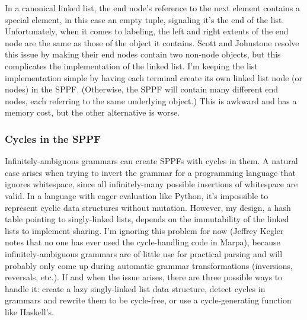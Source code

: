\documentclass[12pt]{article}
\begin{document}
In a canonical linked list, the end node's reference to the next
element contains a special element, in this case an empty tuple,
signaling it's the end of the list.  Unfortunately, when it comes to
labeling, the left and right extents of the end node are the same as
those of the object it contains.  Scott and Johnstone resolve this
issue by making their end nodes contain two non-node objects, but this
complicates the implementation of the linked list.  I'm keeping the
list implementation simple by having each terminal create its own
linked list node (or nodes) in the SPPF.  (Otherwise, the SPPF will
contain many different end nodes, each referring to the same
underlying object.)  This is awkward and has a memory cost, but the
other alternative is worse.

\subsubsection{Cycles in the SPPF}
\label{sec:sppf_cycles}

Infinitely-ambiguous grammars can create SPPFs with cycles in them.  A
natural case arises when trying to invert the grammar for a
programming language that ignores whitespace, since all
infinitely-many possible insertions of whitespace are valid.  In a
language with eager evaluation like Python, it's impossible to
represent cyclic data structures without mutation.  However, my
design, a hash table pointing to singly-linked lists, depends on the
immutability of the linked lists to implement sharing.  I'm ignoring
this problem for now (Jeffrey Kegler notes that no one has ever used
the cycle-handling code in Marpa), because infinitely-ambiguous
grammars are of little use for practical parsing and will probably
only come up during automatic grammar transformations (inversions,
reversals, etc.).  If and when the issue arises, there are three
possible ways to handle it: create a lazy singly-linked list data
structure, detect cycles in grammars and rewrite them to be
cycle-free, or use a cycle-generating function like Haskell's.
\end{document}
